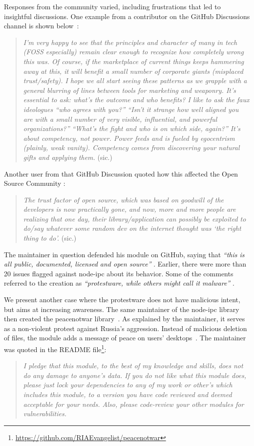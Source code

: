 \documentclass[journal,twocolumn]{IEEEtran}
\begin{document}
 Responses from the community varied, including frustrations that led to insightful discussions.
One example from a contributor on the GitHub Discussions channel is shown below~\cite{Web:discussion}:
\begin{quote}
\textit{I'm very happy to see that the principles and character of many in tech (FOSS especially) remain clear enough to recognize how completely wrong this was. Of course, if the marketplace of current things keeps hammering away at this, it will benefit a small number of corporate giants (misplaced trust/safety). I hope we all start seeing these patterns as we grapple with a general blurring of lines between tools for marketing and weaponry.
It's essential to ask: what's the outcome and who benefits? I like to ask the faux ideologues ``who agrees with you?'' ``Isn't it strange how well aligned you are with a small number of very visible, influential, and powerful organizations?'' ``What's the fight and who is on which side, again?''
It's about competency, not power. Power feeds and is fueled by egocentrism (plainly, weak vanity). Competency comes from discovering your natural gifts and applying them.} (sic.)
\end{quote}

Another user from that GitHub Discussion quoted how this affected the Open Source Community \cite{Web:discussion}:
\begin{quote}
 \textit{The trust factor of open source, which was based on goodwill of the developers is now practically gone, and now, more and more people are realizing that one day, their library/application can possibly be exploited to do/say whatever some random dev on the internet thought was `the right thing to do'.} (sic.)
\end{quote}
The maintainer in question defended his module on GitHub, saying that \textit{``this is all public, documented, licensed and open source''} \cite{kula2022war}. Earlier, there were more than 20 issues flagged against node-ipc about its behavior.
Some of the comments referred to the creation as \textit{``protestware, while others might call it malware''}  \cite{kula2022war}. 

We present another case where the protestware does not have malicious intent, but aims at increasing awareness.
The same maintainer of the node-ipc library then created the peacenotwar library~\cite{Web:node-peacenotwar}.
As explained by the maintainer, it serves as a non-violent protest against Russia's aggression.
Instead of malicious deletion of files, the module adds a message of peace on users' desktops~\cite{Web:peacecommit}.
The maintainer was quoted in the README file\footnote{\url{https://github.com/RIAEvangelist/peacenotwar}}:
\begin{quote}
    \textit{I pledge that this module, to the best of my knowledge and skills, does not do any damage to anyone's data. If you do not like what this module does, please just lock your dependencies to any of my work or other's which includes this module, to a version you have code reviewed and deemed acceptable for your needs. Also, please code-review your other modules for vulnerabilities.}
\end{quote}
\end{document}
